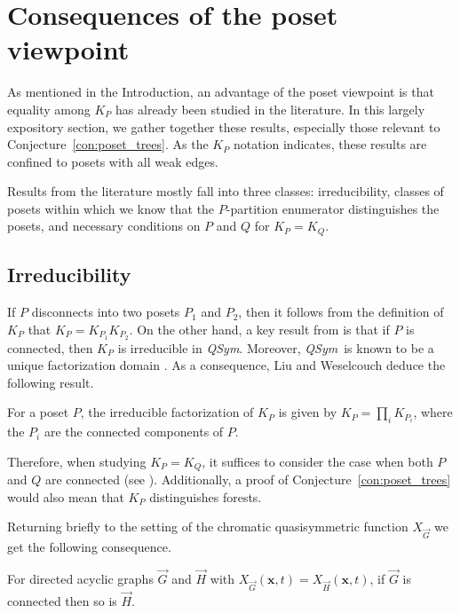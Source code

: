 \documentclass[ALCO,Unicode,published]{cedram}
\newcommand{\diG}{\overrightarrow{G}}
\newcommand{\diH}{\overrightarrow{H}}
\newcommand{\qsym}{{\it{QSym}}}
\newcommand{\x}{\mathbf{x}}
\begin{document}
\section{Consequences of the poset viewpoint}\label{sec:poset_results}

As mentioned in the Introduction, an advantage of the poset viewpoint is that equality among $K_P$ has already been studied in the literature.  In this largely expository section, we gather together these results, especially those relevant to Conjecture~\ref{con:poset_trees}.  As the $K_P$ notation indicates, these results are confined to posets with all weak edges.

Results from the literature mostly fall into three classes: irreducibility, classes of posets within which we know that the $P$-partition enumerator distinguishes the posets, and necessary conditions on $P$ and $Q$ for $K_P = K_Q$.  

\subsection{Irreducibility}

If $P$ disconnects into two posets $P_1$ and $P_2$, then it follows from the definition of $K_P$ that $K_P = K_{P_1}K_{P_2}$.  On the other hand, a key result from \cite{LiWe21} is that if $P$ is connected, then $K_P$ is irreducible in \qsym.  Moreover, \qsym\ is known to be a unique factorization domain \cite{Haz01,LaPy08,MaRe95}.  As a consequence, Liu and Weselcouch deduce the following result.

\begin{corollary}\label{cor:factors}
For a poset $P$, the irreducible factorization of $K_P$ is given by $K_P = \prod_i K_{P_i}$, where the $P_i$ are the connected components of $P$.
\end{corollary}

Therefore, when studying $K_P = K_Q$, it suffices to consider the case when both $P$ and $Q$ are connected (see \cite[Corollary~4.21]{LiWe21}).  Additionally, a proof of Conjecture~\ref{con:poset_trees} would also mean that $K_P$ distinguishes forests.

Returning briefly to the setting of the chromatic quasisymmetric function $X_{\diG}$ we get the following consequence.  

\begin{proposition}
For directed acyclic graphs $\diG$ and $\diH$ with $X_{\diG}(\x,t) = X_{\diH}(\x,t)$, if $\diG$ is connected then so is $\diH$.
\end{proposition}
\end{document}
